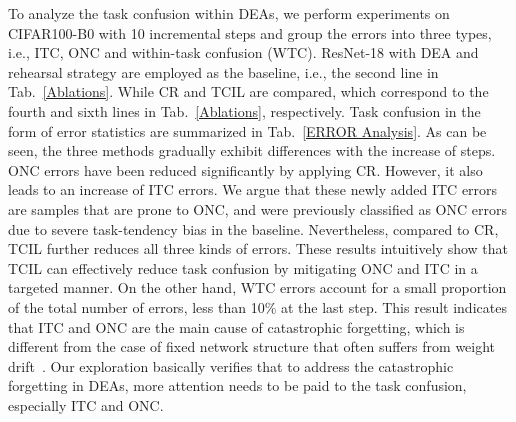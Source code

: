 \documentclass[letterpaper]{article} %
\begin{document}
To analyze the task confusion within DEAs, we perform experiments on CIFAR100-B0 with 10 incremental steps and group the errors into three types, i.e., ITC, ONC and within-task confusion (WTC). ResNet-18 with DEA and rehearsal strategy are employed as the baseline, i.e., the second line in Tab.~\ref{Ablations}. While CR and TCIL are compared, which correspond to the fourth and sixth lines in Tab.~\ref{Ablations}, respectively. Task confusion in the form of error statistics are summarized in Tab.~\ref{ERROR Analysis}. As can be seen, the three methods gradually exhibit differences with the increase of steps. ONC errors have been reduced significantly by applying CR. However, it also leads to an increase of ITC errors. We argue that these newly added ITC errors are samples that are prone to ONC, and were previously classified as ONC errors due to severe task-tendency bias in the baseline. Nevertheless, compared to CR, TCIL further reduces all three kinds of errors. These results intuitively show that TCIL can effectively reduce task confusion by mitigating ONC and ITC in a targeted manner. On the other hand, WTC errors account for a small proportion of the total number of errors, less than 10\% at the last step. This result indicates that ITC and ONC are the main cause of catastrophic forgetting, which is different from the case of fixed network structure that often suffers from weight drift~\cite{e2, t38}. Our exploration basically verifies that to address the catastrophic forgetting in DEAs, more attention needs to be paid to the task confusion,  especially ITC and ONC.
\end{document}
